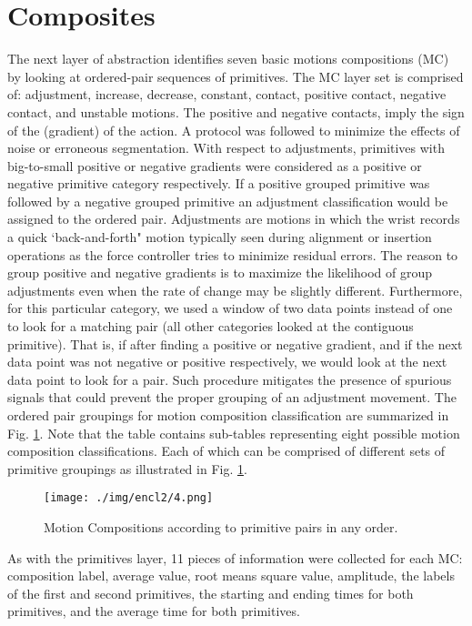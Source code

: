 \section{Composites} \label{subsec:Composites}
The next layer of abstraction identifies seven basic motions compositions (MC) by looking at ordered-pair sequences of primitives. The MC layer set is comprised of: adjustment, increase, decrease, constant, contact, positive contact, negative contact, and unstable motions. The positive and negative contacts, imply the sign of the (gradient) of the action.
A protocol was followed to minimize the effects of noise or erroneous segmentation. With respect to adjustments, primitives with big-to-small positive or negative gradients were considered as a positive or negative primitive category respectively. If a positive grouped primitive was followed by a negative grouped primitive an adjustment classification would be assigned to the ordered pair. Adjustments are motions in which the wrist records a quick `back-and-forth" motion typically seen during alignment or insertion operations as the force controller tries to minimize residual errors. The reason to group positive and negative gradients is to maximize the likelihood of group adjustments even when the rate of change may be slightly different. Furthermore, for this particular category, we used a window of two data points instead of one to look for a matching pair (all other categories looked at the contiguous primitive). That is, if after finding a positive or negative gradient, and if the next data point was not negative or positive respectively, we would look at the next data point to look for a pair. Such procedure mitigates the presence of spurious signals that could prevent the proper grouping of an adjustment movement.
The ordered pair groupings for motion composition classification are summarized in Fig. \ref{fig:MotionCompositions}. Note that the table contains sub-tables representing eight possible motion composition classifications. Each of which can be comprised of different sets of primitive groupings as illustrated in Fig. \ref{fig:MotionCompositions}.
\begin{figure}[h]
    \centering
    \texttt{[image: ./img/encl2/4.png]}
    \caption{Motion Compositions according to primitive pairs in any order.}
    \label{fig:MotionCompositions}
\end{figure}
As with the primitives layer, 11 pieces of information were collected for each MC: composition label, average value, root means square value, amplitude, the labels of the first and second primitives, the starting and ending times for both primitives, and the average time for both primitives.
